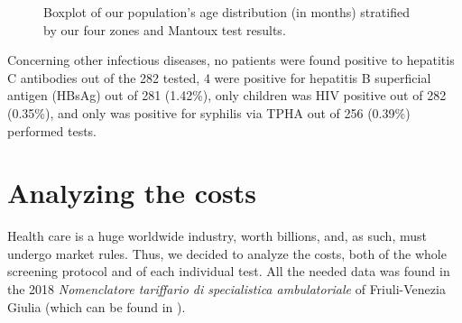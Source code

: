 \begin{figure}[H]
\caption{Boxplot of our population's age distribution (in months) stratified by our four zones and Mantoux test results.}
\label{fig:boxplot_Mantoux}
\end{figure}

Concerning other infectious diseases, no patients were found positive to hepatitis C antibodies out of the 282 tested, 4 were positive for hepatitis B superficial antigen (HBsAg) out of 281 (1.42\%), only children was HIV positive out of 282 (0.35\%), and only was positive for syphilis via TPHA out of 256 (0.39\%) performed tests.

\section{Analyzing the costs}\label{sec:analyzingcosts}
Health care is a huge worldwide industry, worth billions, and, as such, must undergo market rules. Thus, we decided to analyze the costs, both of the whole screening protocol and of each individual test. All the needed data was found in the 2018 \textit{Nomenclatore tariffario di specialistica ambulatoriale} of Friuli-Venezia Giulia (which can be found in \cite{nomenclatore}).

